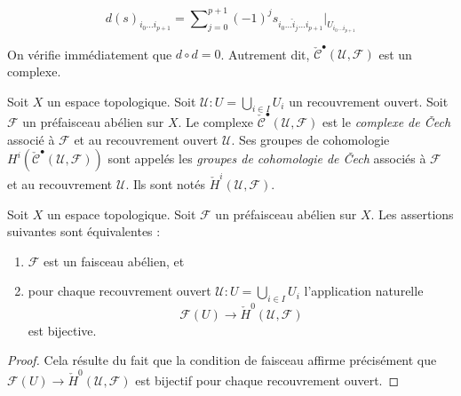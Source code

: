 \begin{equation}
\label{equation-d-cech}
d(s)_{i_0\ldots i_{p + 1}}
=
\sum\nolimits_{j = 0}^{p + 1}
(-1)^j
s_{i_0\ldots \hat i_j \ldots i_{p + 1}}|_{U_{i_0\ldots i_{p + 1}}}
\end{equation}

On vérifie immédiatement que $d \circ d = 0$. Autrement dit,
$\check{\mathcal{C}}^\bullet(\mathcal{U}, \mathcal{F})$ est un complexe.

\begin{definition}

\label{definition-cech-complex}
Soit $X$ un espace topologique. Soit $\mathcal{U} : U = \bigcup_{i \in I} U_i$ un recouvrement ouvert. Soit $\mathcal{F}$ un préfaisceau abélien sur $X$. Le complexe $\check{\mathcal{C}}^\bullet(\mathcal{U}, \mathcal{F})$ est le {\it complexe de {\v C}ech} associé à $\mathcal{F}$ et au recouvrement ouvert $\mathcal{U}$. Ses groupes de cohomologie $H^i(\check{\mathcal{C}}^\bullet(\mathcal{U}, \mathcal{F}))$ sont appelés les {\it groupes de cohomologie de {\v C}ech} associés à $\mathcal{F}$ et au recouvrement $\mathcal{U}$. Ils sont notés $\check H^i(\mathcal{U}, \mathcal{F})$.
\end{definition}

\begin{lemma}

\label{lemma-cech-h0}

Soit $X$ un espace topologique. Soit $\mathcal{F}$ un préfaisceau abélien sur $X$. Les assertions suivantes sont équivalentes :

\begin{enumerate}

\item  $\mathcal{F}$ est un faisceau abélien, et
\item pour chaque recouvrement ouvert $\mathcal{U} : U = \bigcup_{i \in I} U_i$
l'application naturelle
$$
\mathcal{F}(U) \to \check{H}^0(\mathcal{U}, \mathcal{F})
$$
est bijective.

\end{enumerate}

\end{lemma}

\begin{proof}

Cela résulte du fait que la condition de faisceau affirme précisément que
$\mathcal{F}(U) \to \check{H}^0(\mathcal{U}, \mathcal{F})$
est bijectif pour chaque recouvrement ouvert.

\end{proof}

